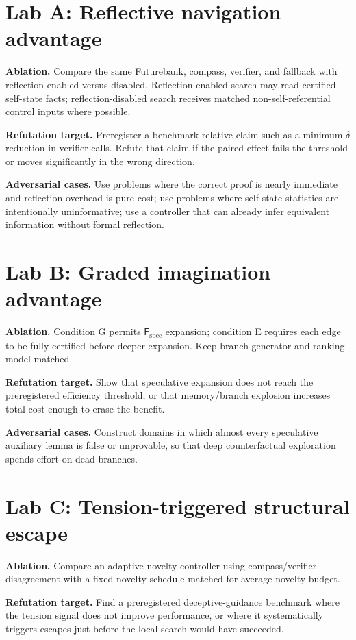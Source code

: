 \documentclass[11pt,openany]{book}
\theoremstyle{definition}
\theoremstyle{remark}
\newcommand{\Future}{\mathsf{F}}
\newcommand{\Spec}{\Future_{\mathrm{spec}}}
\begin{document}
\section{Lab A: Reflective navigation advantage}
\textbf{Ablation.} Compare the same Futurebank, compass, verifier, and fallback with reflection enabled versus disabled. Reflection-enabled search may read certified self-state facts; reflection-disabled search receives matched non-self-referential control inputs where possible.

\textbf{Refutation target.} Preregister a benchmark-relative claim such as a minimum $\delta$ reduction in verifier calls. Refute that claim if the paired effect fails the threshold or moves significantly in the wrong direction.

\textbf{Adversarial cases.} Use problems where the correct proof is nearly immediate and reflection overhead is pure cost; use problems where self-state statistics are intentionally uninformative; use a controller that can already infer equivalent information without formal reflection.

\section{Lab B: Graded imagination advantage}
\textbf{Ablation.} Condition G permits $\Spec$ expansion; condition E requires each edge to be fully certified before deeper expansion. Keep branch generator and ranking model matched.

\textbf{Refutation target.} Show that speculative expansion does not reach the preregistered efficiency threshold, or that memory/branch explosion increases total cost enough to erase the benefit.

\textbf{Adversarial cases.} Construct domains in which almost every speculative auxiliary lemma is false or unprovable, so that deep counterfactual exploration spends effort on dead branches.

\section{Lab C: Tension-triggered structural escape}
\textbf{Ablation.} Compare an adaptive novelty controller using compass/verifier disagreement with a fixed novelty schedule matched for average novelty budget.

\textbf{Refutation target.} Find a preregistered deceptive-guidance benchmark where the tension signal does not improve performance, or where it systematically triggers escapes just before the local search would have succeeded.
\end{document}
